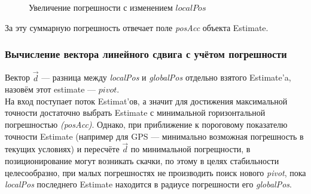 \documentclass[a4paper, 11pt, titlepage]{article}
\begin{document}
          \begin{figure}[H]
            \centering
            \caption{Увеличение погрешности с изменением $localPos$}
          \end{figure}

          За эту суммарную погрешность отвечает поле \textit{posAcc} объекта Estimate.

        \subsubsection{Вычисление вектора линейного сдвига с учётом погрешности}
          Вектор $\vec{d}$ --- разница между \textit{localPos} и \textit{globalPos} отдельно взятого Estimate'a, назовём этот estimate --- $pivot$.\\
          На вход поступает поток Estimat'ов, а значит для достижения максимальной точности достаточно выбрать Estimate с минимальной 
          горизонтальной погрешностью \textit{(posAcc)}. Однако, при приближение к пороговому показателю точности Estimate (например для GPS --- минимально
          возможная погрешность в текущих условиях) и пересчёте $\vec{d}$ по минимальной погрещности, в позиционирование могут возникать скачки,
          по этому в целях стабильности целесообразно, при малых погрешностях не производить поиск нового \textit{pivot}, пока \textit{localPos} последнего
          Estimate находится в радиусе погрешности его \textit{globalPos}.
\end{document}
